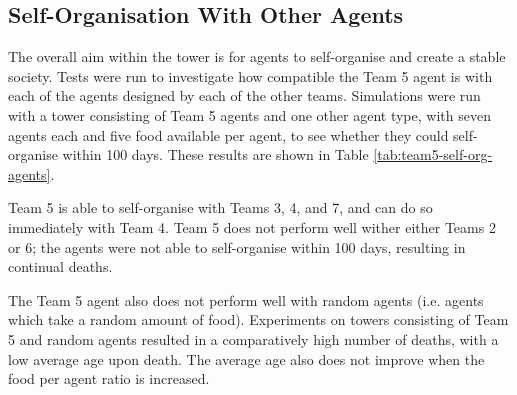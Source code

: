 


\subsection*{Self-Organisation With Other Agents}
The overall aim within the tower is for agents to self-organise and create a stable society. Tests were run to investigate how compatible the Team 5 agent is with each of the agents designed by each of the other teams. Simulations were run with a tower consisting of Team 5 agents and one other agent type, with seven agents each and five food available per agent, to see whether they could self-organise within 100 days. These results are shown in Table \ref{tab:team5-self-org-agents}.

Team 5 is able to self-organise with Teams 3, 4, and 7, and can do so immediately with Team 4. Team 5 does not perform well wither either Teams 2 or 6; the agents were not able to self-organise within 100 days, resulting in continual deaths.

The Team 5 agent also does not perform well with random agents (i.e. agents which take a random amount of food). Experiments on towers consisting of Team 5 and random agents resulted in a comparatively high number of deaths, with a low average age upon death. The average age also does not improve when the food per agent ratio is increased.

